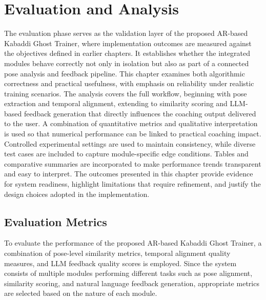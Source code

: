 \chapter{Evaluation and Analysis}
\begin{sloppypar}

The evaluation phase serves as the validation layer of the proposed AR-based Kabaddi Ghost Trainer, where implementation outcomes are measured against the objectives defined in earlier chapters. It establishes whether the integrated modules behave correctly not only in isolation but also as part of a connected pose analysis and feedback pipeline. This chapter examines both algorithmic correctness and practical usefulness, with emphasis on reliability under realistic training scenarios. The analysis covers the full workflow, beginning with pose extraction and temporal alignment, extending to similarity scoring and LLM-based feedback generation that directly influences the coaching output delivered to the user. A combination of quantitative metrics and qualitative interpretation is used so that numerical performance can be linked to practical coaching impact. Controlled experimental settings are used to maintain consistency, while diverse test cases are included to capture module-specific edge conditions. Tables and comparative summaries are incorporated to make performance trends transparent and easy to interpret. The outcomes presented in this chapter provide evidence for system readiness, highlight limitations that require refinement, and justify the design choices adopted in the implementation.


\section{Evaluation Metrics}

To evaluate the performance of the proposed AR-based Kabaddi Ghost Trainer, a combination of pose-level similarity metrics, temporal alignment quality measures, and LLM feedback quality scores is employed. Since the system consists of multiple modules performing different tasks such as pose alignment, similarity scoring, and natural language feedback generation, appropriate metrics are selected based on the nature of each module.


\end{sloppypar}
